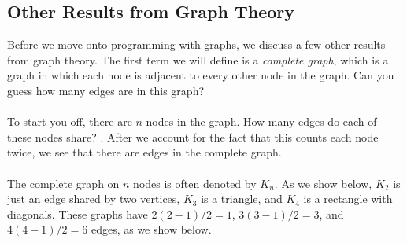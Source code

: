 \documentclass[12pt]{article}
\begin{document}
\subsection{Other Results from Graph Theory}
Before we move onto programming with graphs, we discuss a few other results from graph theory. The first term we will define is a \emph{complete graph}, which is a graph in which each node is adjacent to every other node in the graph. Can you guess how many edges are in this graph?
\\
\\
To start you off, there are $n$ nodes in the graph. How many edges do each of these nodes share? \underline{\hspace{2cm}}. After we account for the fact that this counts each node twice, we see that there are \underline{\hspace{3cm}} edges in the complete graph.
\\
\\
The complete graph on $n$ nodes is often denoted by $K_n$. As we show below, $K_2$ is just an edge shared by two vertices, $K_3$ is a triangle, and $K_4$ is a rectangle with diagonals. These graphs have $2(2-1)/2=1$, $3(3-1)/2=3$, and $4(4-1)/2=6$ edges, as we show below.
\\
\\
\end{document}
